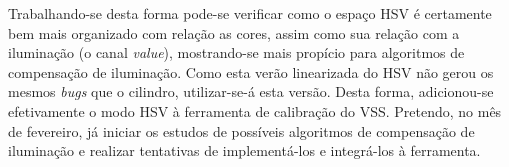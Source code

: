 \documentclass{article}[twocolumn]
\begin{document}
	Trabalhando-se desta forma pode-se verificar como o espa\c{c}o HSV \'e certamente bem mais
	organizado com rela\c{c}\~ao as cores, assim como sua rela\c{c}\~ao com a ilumina\c{c}\~ao
	(o canal \textit{value}), mostrando-se mais prop\'icio para algoritmos de compensa\c{c}\~ao
	de ilumina\c{c}\~ao. Como esta ver\~ao linearizada do HSV n\~ao gerou os mesmos \textit{bugs}
	que o cilindro, utilizar-se-\'a esta vers\~ao. Desta forma, adicionou-se efetivamente o
	modo HSV \`a ferramenta de calibra\c{c}\~ao do VSS. Pretendo, no m\^es de fevereiro, j\'a
	iniciar os estudos de poss\'iveis algoritmos de compensa\c{c}\~ao de ilumina\c{c}\~ao e
	realizar tentativas de implement\'a-los e integr\'a-los \`a ferramenta.
\end{document}
